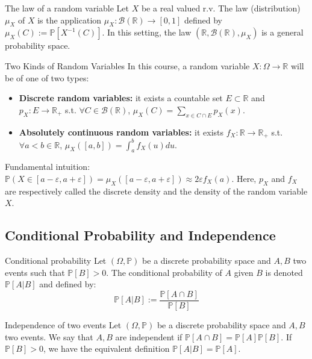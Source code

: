 \documentclass[11pt, a4paper]{article}
\newcommand{\eps}{\varepsilon}
\begin{document}
\begin{proposition}{The law of a random variable}{}
Let $X$ be a real valued r.v. The law (distribution) $\mu_X$ of $X$ is the application $\mu_X: \mathcal{B}(\mathbb{R}) \rightarrow [0,1]$ defined by $\mu_X(C) := \mathbb{P}[X^{-1}(C)]$. In this setting, the law $(\mathbb{R}, \mathcal{B}(\mathbb{R}), \mu_X)$ is a general probability space.
\end{proposition}

\begin{remark}{Two Kinds of Random Variables}{}
In this course, a random variable $X: \Omega \rightarrow \mathbb{R}$ will be of one of two types:
\begin{itemize}
    \item \textbf{Discrete random variables:} it exists a countable set $E \subset \mathbb{R}$ and $p_X: E \rightarrow \mathbb{R}_+$ s.t. $\forall C \in \mathcal{B}(\mathbb{R})$, $\mu_X(C) = \sum_{x \in C \cap E} p_X(x)$.
    \item \textbf{Absolutely continuous random variables:} it exists $f_X: \mathbb{R} \rightarrow \mathbb{R}_+$ s.t. $\forall a < b \in \mathbb{R}$, $\mu_X([a,b]) = \int_a^b f_X(u) du$.
\end{itemize}
Fundamental intuition: $\mathbb{P}(X \in [a-\eps, a+\eps]) = \mu_X([a-\eps, a+\eps]) \approx 2\eps f_X(a)$. Here, $p_X$ and $f_X$ are respectively called the discrete density and the density of the random variable $X$.
\end{remark}

\subsection{Conditional Probability and Independence}

\begin{definition}{Conditional probability}{}
Let $(\Omega, \mathbb{P})$ be a discrete probability space and $A, B$ two events such that $\mathbb{P}[B] > 0$. The conditional probability of $A$ given $B$ is denoted $\mathbb{P}[A\vert{}B]$ and defined by:
\[\mathbb{P}[A\vert{}B] := \frac{\mathbb{P}[A \cap B]}{\mathbb{P}[B]}\]

\end{definition}

\begin{definition}{Independence of two events}{}
Let $(\Omega, \mathbb{P})$ be a discrete probability space and $A, B$ two events. We say that $A, B$ are independent if $\mathbb{P}[A \cap B] = \mathbb{P}[A]\mathbb{P}[B]$. If $\mathbb{P}[B] > 0$, we have the equivalent definition $\mathbb{P}[A\vert{}B] = \mathbb{P}[A]$.
\end{definition}
\end{document}
